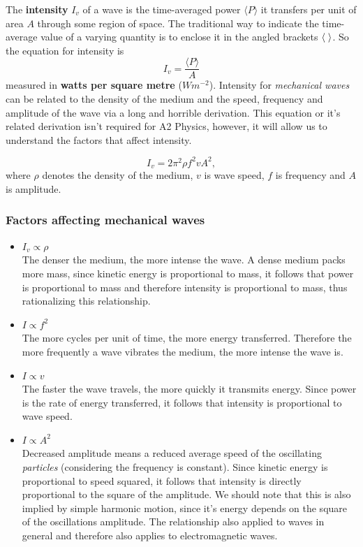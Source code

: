 The \textbf{intensity} $I_v$ of a wave is the time-averaged power $\langle P \rangle$ it transfers per unit of area $A$ through some region of space. The traditional way to indicate the time-average value of a varying quantity is to enclose it in the angled brackets $\langle \hspace{1mm} \rangle$. So the equation for intensity is
\begin{equation}
    I_v = \frac{\langle P \rangle}{A}
    \label{eq:intensity}
\end{equation}
measured in \textbf{watts per square metre} ($Wm^{-2}$). Intensity for \textit{mechanical waves} can be related to the density of the medium and the speed, frequency and amplitude of the wave via a long and horrible derivation. This equation or it's related derivation isn't required for A2 Physics, however, it will allow us to understand the factors that affect intensity. 

\begin{equation}
    I_v = 2 \pi^2 \rho f^2 v A^2,
\end{equation}
where $\rho$ denotes the density of the medium, $v$ is wave speed, $f$ is frequency and $A$ is amplitude. 

\subsubsection{Factors affecting mechanical waves}
\begin{itemize}
    \item $I_v \propto \rho$ \\
    The denser the medium, the more intense the wave. A dense medium packs more mass, since kinetic energy is proportional to mass, it follows that power is proportional to mass and therefore intensity is proportional to mass, thus rationalizing this relationship.
    \item $I \propto f^2$ \\
    The more cycles per unit of time, the more energy transferred. Therefore the more frequently a wave vibrates the medium, the more intense the wave is.
    \item $I \propto v$ \\
    The faster the wave travels, the more quickly it transmits energy. Since power is the rate of energy transferred, it follows that intensity is proportional to wave speed.
    \item $I \propto A^2$ \\
    Decreased amplitude means a reduced average speed of the oscillating \textit{particles} (considering the frequency is constant). Since kinetic energy is proportional to speed squared, it follows that intensity is directly proportional to the square of the amplitude. We should note that this is also implied by simple harmonic motion, since it's energy depends on the square of the oscillations amplitude. The relationship also applied to waves in general and therefore also applies to electromagnetic waves.
\end{itemize}

